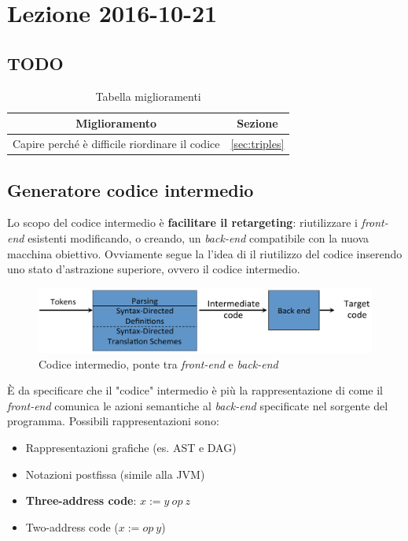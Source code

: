 \section{Lezione 2016-10-21}
\subsection{TODO}
\begin{table}[H]
\begin{center}
\begin{tabular}{|p{\textwidth}|c|}
\hline
\multicolumn{1}{|c|}{\textbf{Miglioramento}} & \textbf{Sezione} \\ \hline
Capire perch\'e \`e difficile riordinare il codice &
\ref{sec:triples} \\ \hline
\end{tabular}
\end{center}
\caption{Tabella miglioramenti}
\label{tab:tab_todo}
\end{table}

\subsection{Generatore codice intermedio}
Lo scopo del codice intermedio \`e \textbf{facilitare il retargeting}:
riutilizzare i \textit{front-end} esistenti modificando, o creando, un
\textit{back-end} compatibile con la nuova macchina obiettivo. Ovviamente segue
la l'idea di il riutilizzo del codice inserendo uno stato d'astrazione
superiore, ovvero il codice intermedio.

\begin{figure}[H]
  \includegraphics[scale=0.4]{res/image/compiler_backend}
  \caption{Codice intermedio, ponte tra \textit{front-end} e \textit{back-end}}
  \label{img:compiler_backend}
\end{figure}

\`E da specificare che il "codice" intermedio \`e pi\`u la rappresentazione
di come il \textit{front-end} comunica le azioni semantiche al
\textit{back-end} specificate nel sorgente del programma. Possibili
rappresentazioni sono:
\begin{itemize}
\item Rappresentazioni grafiche (es. AST e DAG)
\item Notazioni postfissa (simile alla JVM)
\item \textbf{Three-address code}: $x := y \ op \ z$
\item Two-address code ($x := op \ y$)
\end{itemize}

